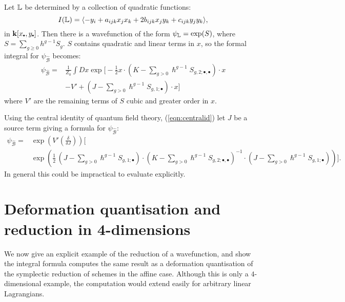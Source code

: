     \begin{ex} 
    Let \( \mathbb{L}\) be determined by a collection of quadratic functions: 
    \[ I(\mathbb{L}) = \langle -y_i + a_{ijk} x_j x_k + 2 b_{ijk} x_j y_k + c_{ijk} y_j y_k \rangle, \] 
    in \( \mathbf{k}[x_{\sbt},y_{\sbt}]\). Then there is a wavefunction of the form \(\psi_{\mathbb{L}} = \exp(S)\), where \(S= \sum_{g\geq 0} h^{g-1} S_g\). \(S\) contains quadratic and linear terms in \(x\), so the formal integral for \( \psi_{\widehat{\mathcal{B}}}\) becomes:
    \begin{align*}
    \psi_{\widehat{\mathcal{B}}} =
    &\frac{1}{Z_0}\int Dx \exp \bigg[
    -\frac{1}{2} x \cdot \left(K - \sum_{g>0} \hslash^{g-1} S_{g,2;\bullet,\bullet} \right) \cdot x \\  
    & -V' + \left(J-\sum_{g>0} \hslash^{g-1} S_{g,1;\bullet}\right) \cdot x \bigg]
    \end{align*}
    where \(V'\) are the remaining terms of \(S\) cubic and greater order in \(x\).
    
    Using the central identity of quantum field theory, (\ref{eqn:centralid}) let \(J\) be a source term giving a formula for \( \psi_{\widehat{\mathcal{B}}}\):
    \begin{align*} 
    \psi_{\widehat{\mathcal{B}}}  =&  \exp\left(V'\left(\frac{\delta}{\delta J} \right) \right) \bigg[ \\ 
    & \exp\left( \frac{1}{2}\, (J-\sum_{g>0} \hslash^{g-1} S_{g,1;\bullet}) \cdot (K-\sum_{g>0} \hslash^{g-1} S_{g,2;\bullet,\bullet})^{-1}\cdot (J-\sum_{g>0} \hslash^{g-1} S_{g,1;\bullet}) \right) \bigg].  
    \end{align*}
    In general this could be impractical to evaluate explicitly.
    \end{ex}

    \section{Deformation quantisation and reduction in 4-dimensions}
    \label{sec:examplereduct4d}
    
    We now give an explicit example of the reduction of a wavefunction, and show the integral formula computes the same result as a deformation quantisation of the symplectic reduction of schemes in the affine case. Although this is only a \(4\)-dimensional example, the computation would extend easily for arbitrary linear Lagrangians. 
    
